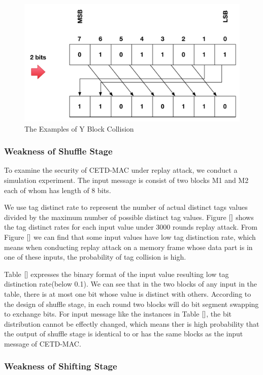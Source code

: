 \documentclass{article}
\begin{document}
\begin{figure}
{\begin{minipage}[b]{0.45\textwidth}
\includegraphics[width=1\textwidth]{./diagrams/r_d_2bits.pdf}
\end{minipage}
}
 \caption{The Examples of Y Block Collision}
 \label{fig: Y-blk-collision}
\end{figure}
\subsubsection{Weakness of Shuffle Stage}
To examine the security of CETD-MAC under replay attack, we conduct a simulation experiment. The input message is consist of two blocks M1 and M2 each of whom has length of 8 bits. 

We use tag distinct rate to represent the number of actual distinct tags values divided by the maximum number of possible distinct tag values. Figure $\ref{}$ shows the tag distinct rates for each input value under 3000 rounds replay attack. From Figure $\ref{}$ we can find that some input values have low tag distinction rate, which means when conducting replay attack on a memory frame whose data part is in one of these inputs, the probability of tag collision is high.

Table $\ref{}$ expresses the binary format of the input value resulting low tag distinction rate(below 0.1). We can see that in the two blocks of any input in the table, there is at most one bit whose value is distinct with others. According to the design of shuffle stage, in each round two blocks will do bit segment swapping to exchange bits. For input message like the instances in Table $\ref{}$, the bit distribution cannot be effectly changed, which means ther is high probability that the output of shuffle stage is identical to or has the same blocks as the input message of CETD-MAC. 


\subsubsection{Weakness of Shifting Stage}
\end{document}

